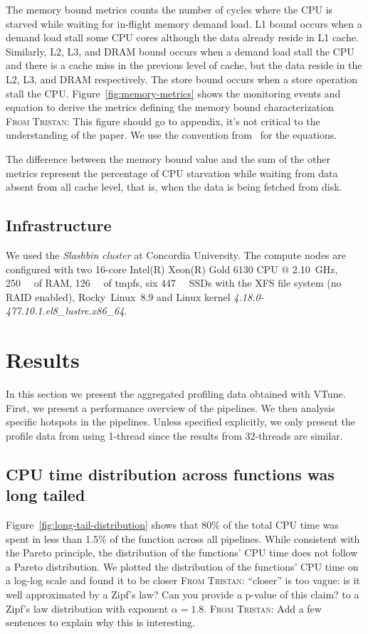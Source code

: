\documentclass[conference]{IEEEtran}
\newcommand{\TG}[1]{\color{blue}\textsc{From Tristan: }#1\color{black}}
\begin{document}
The memory bound metrics counts the number of cycles where the CPU is starved while waiting for in-flight memory demand load. L1 bound occurs when a demand load stall some CPU cores although the data already reside in L1 cache. Similarly, L2, L3, and DRAM bound occurs when a demand load stall the CPU and there is a cache miss in the previous level of cache, but the data reside in the L2, L3, and DRAM respectively. The store bound occurs when a store operation stall the CPU. Figure~\ref{fig:memory-metrics} shows the monitoring events and equation to derive the metrics defining the memory bound characterization~\cite{Intel2006-lc} \TG{This figure should go to appendix, it's not critical to the understanding of the paper}. We use the convention from~\cite{Kukunas2015-jd} for the equations.
			
The difference between the memory bound value and the sum of the other metrics represent the percentage of CPU starvation while waiting from data absent from all cache level, that is, when the data is being fetched from disk.
			
\subsection{Infrastructure}
We used the \textit{Slashbin cluster} at Concordia University. The compute nodes are configured with two 16-core Intel(R) Xeon(R) Gold 6130 CPU @ \SI{2.10}{\giga\hertz}, \SI{250}{\gibi\byte} of RAM, \SI{126}{\gibi\byte} of tmpfs, six \SI{447}{\gibi\byte} SSDs with the XFS file system (no RAID enabled), Rocky~Linux~8.9 and Linux kernel \textit{4.18.0-477.10.1.el8\_lustre.x86\_64}.
			
\section{Results}
In this section we present the aggregated profiling data obtained with VTune. First, we present a performance overview of the pipelines. We then analysis specific hotspots in the pipelines. Unless specified explicitly, we only present the profile data from using 1-thread since the results from 32-threads are similar.
			
\subsection{CPU time distribution across functions was long tailed}
Figure~\ref{fig:long-tail-distribution} shows that 80\% of the total CPU time was spent in less than 1.5\% of the function across all pipelines. While consistent with the Pareto principle, the distribution of the functions' CPU time does not follow a Pareto distribution. We plotted the distribution of the functions' CPU time on a log-log scale and found it to be closer \TG{``closer'' is too vague: is it well approximated by a Zipf's law? Can you provide a p-value of this claim?} to a Zipf's law distribution with exponent $\alpha=1.8$. \TG{Add a few sentences to explain why this is interesting.}
\end{document}

